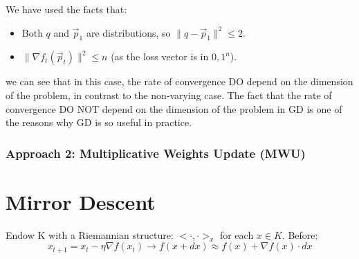 \documentclass[11pt]{book} %
\begin{document}
We have used the facts that: 
\begin{itemize}
    \item Both $q$ and $\vec{p}_1$ are distributions, so $\| q - \vec{p}_1 \|^2 \leq 2$.
    \item $\| \nabla f_t(\vec{p}_t) \|^2 \leq n$ (as the loss vector is in ${0,1}^n$).
\end{itemize}

we can see that in this case, the rate of convergence DO depend on the dimension of the problem, in contrast to the non-varying case.
The fact that the rate of convergence DO NOT depend on the dimension of the problem in GD is one of the reasons why GD is so useful in practice.


\subsubsection{Approach 2: Multiplicative Weights Update (MWU)}


\section{Mirror Descent}

Endow K with a Riemannian structure: $<\cdot, \cdot>_x$ for each $x \in K$. 
Before: 
\begin{equation}
    x_{t+1} = x_t - \eta \nabla f(x_t) \rightarrow f(x + dx) \approx f(x) + \nabla f(x) \cdot dx
\end{equation}

\end{document}
